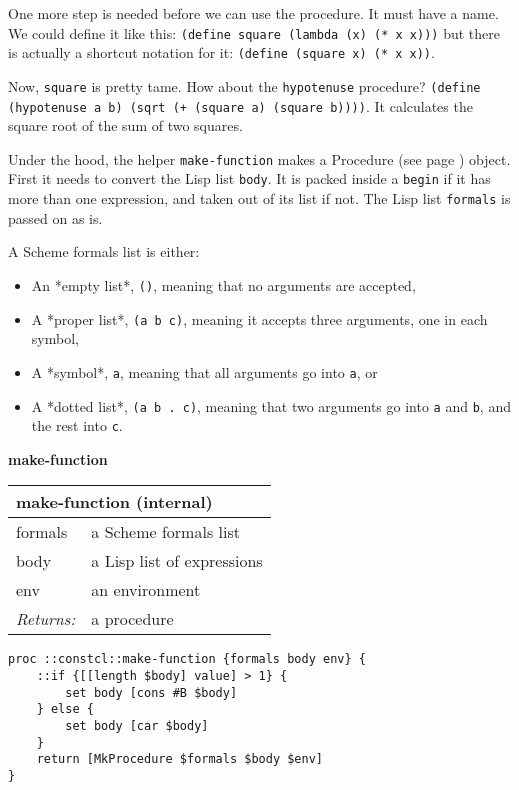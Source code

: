 \documentclass{report}
\begin{document}
One more step is needed before we can use the procedure. It must have a name. We could define it like this: \texttt{(define square (lambda (x) (* x x)))} but there is actually a shortcut notation for it: \texttt{(define (square x) (* x x))}.


Now, \texttt{square} is pretty tame. How about the \texttt{hypotenuse} procedure? \texttt{(define (hypotenuse a b) (sqrt (+ (square a) (square b))))}. It calculates the square root of the sum of two squares.


Under the hood, the helper \texttt{make-function} makes a Procedure (see page \pageref{control}) object. First it needs to convert the Lisp list \texttt{body}. It is packed inside a \texttt{begin} if it has more than one expression, and taken out of its list if not. The Lisp list \texttt{formals} is passed on as is.


A Scheme formals list is either:

\begin{itemize}
\item An *empty list*, \texttt{()}, meaning that no arguments are accepted,
\item A *proper list*, \texttt{(a b c)}, meaning it accepts three arguments, one in each symbol,
\item A *symbol*, \texttt{a}, meaning that all arguments go into \texttt{a}, or
\item A *dotted list*, \texttt{(a b . c)}, meaning that two arguments go into \texttt{a} and \texttt{b}, and the rest into \texttt{c}.
\end{itemize}

\textbf{make-function}

\begin{tabular}{ |l l| }
\hline
\multicolumn{2}{|l|}{make-function (internal)} \\
\hline
formals & a Scheme formals list \\
body & a Lisp list of expressions \\
env & an environment \\
\textit{Returns:} & a procedure \\
\hline
\end{tabular}

\noindent\makebox[\linewidth]{\rule{\linewidth}{0.4pt}}
\begin{lstlisting}
proc ::constcl::make-function {formals body env} {
    ::if {[[length $body] value] > 1} {
        set body [cons #B $body]
    } else {
        set body [car $body]
    }
    return [MkProcedure $formals $body $env]
}
\end{lstlisting}
\noindent\makebox[\linewidth]{\rule{\linewidth}{0.4pt}}
\end{document}
